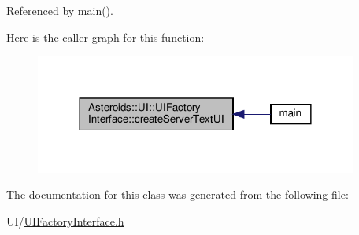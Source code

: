 Referenced by main().

Here is the caller graph for this function\+:\nopagebreak
\begin{figure}[H]
\begin{center}
\leavevmode
\includegraphics[width=300pt]{classAsteroids_1_1UI_1_1UIFactoryInterface_a830fa72105e7f123146383330f2fa8b9_icgraph}
\end{center}
\end{figure}


The documentation for this class was generated from the following file\+:\begin{DoxyCompactItemize}
\item 
U\+I/\hyperlink{UIFactoryInterface_8h}{U\+I\+Factory\+Interface.\+h}\end{DoxyCompactItemize}
